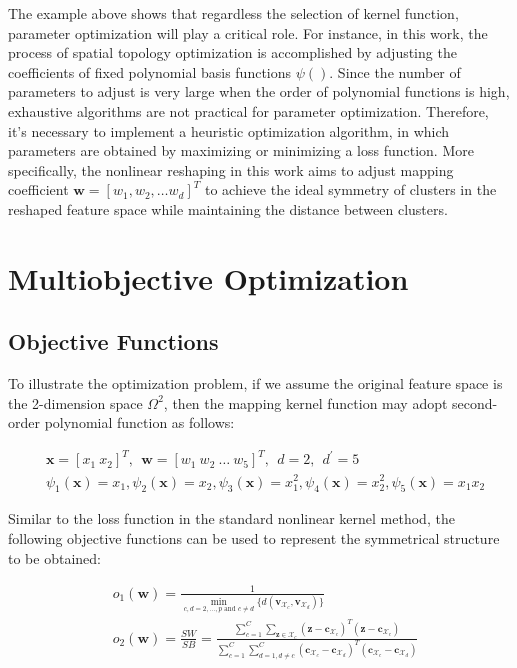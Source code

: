 The example above shows that regardless the selection of kernel function, parameter optimization will play a critical role. For instance, in this work, the process of spatial topology optimization is accomplished by adjusting the coefficients of fixed polynomial basis functions $\psi()$. Since the number of parameters to adjust is very large when the order of polynomial functions is high, exhaustive algorithms are not practical for parameter optimization. Therefore, it's necessary to implement a heuristic optimization algorithm, in which parameters are obtained by maximizing or minimizing a loss function. More specifically, the nonlinear reshaping in this work aims to adjust mapping coefficient  $\mathbf{w} = [w_1,w_2,\dots w_d]^T$ to achieve the ideal symmetry of clusters in the reshaped feature space while maintaining the distance between clusters.


\section{Multiobjective Optimization}

\subsection{Objective Functions}

To illustrate the optimization problem, if we assume the original feature space is the 2-dimension space $\Omega^2$, then the mapping kernel function may adopt second-order polynomial function as follows:

\begin{align}
\nonumber
&\mathbf{x}=[x_1~ x_2]^T,~~ \mathbf{w}=[w_1~ w_2~ \dots~ w_5]^T,~~d=2, ~~d^\prime=5\\
&\psi_1(\mathbf{x})=x_1, \psi_2(\mathbf{x})=x_2, \psi_3(\mathbf{x})=x_1^2, \psi_4(\mathbf{x})=x_2^2, \psi_5(\mathbf{x})=x_1x_2
\label{eq5}
\end{align}

Similar to the loss function in the standard nonlinear kernel method, the following objective functions can be used to represent the symmetrical structure to be obtained:

\begin{align}
\label{eq:obj}
&o_1(\mathbf{w}) = \frac{1}{\underset{c,d=2,\dots,p \text{ and } c\neq d }{\min}\{d(\mathbf{v}_{\mathcal{X}_c},\mathbf{v}_{\mathcal{X}_d})\}} \\ %
\nonumber 
&o_2(\mathbf{w}) = \frac{SW}{SB}=\frac{\sum_{c=1}^{C}  \sum_{\mathbf{z} \in \mathcal{X}_c}   (\mathbf{z}-\mathbf{c}_{\mathcal{X}_c})^T(\mathbf{z}-\mathbf{c}_{\mathcal{X}_c})}{\sum_{c=1}^{C}\sum_{d=1, d\neq c}^{C}  (\mathbf{c}_{\mathcal{X}_c}-\mathbf{c}_{\mathcal{X}_d})^T(\mathbf{c}_{\mathcal{X}_c}-\mathbf{c}_{\mathcal{X}_d}) }
\end{align}

